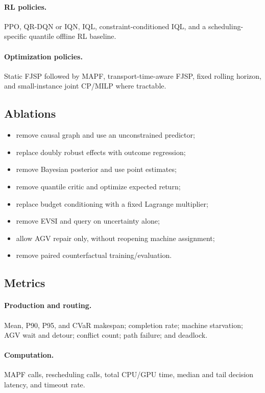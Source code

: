 \documentclass[11pt,a4paper]{article}
\begin{document}
\paragraph{RL policies.}
PPO, QR-DQN or IQN, IQL, constraint-conditioned IQL, and a scheduling-specific
quantile offline RL baseline.

\paragraph{Optimization policies.}
Static FJSP followed by MAPF, transport-time-aware FJSP, fixed rolling horizon,
and small-instance joint CP/MILP where tractable.

\subsection{Ablations}

\begin{itemize}[leftmargin=*]
    \item remove causal graph and use an unconstrained predictor;
    \item replace doubly robust effects with outcome regression;
    \item remove Bayesian posterior and use point estimates;
    \item remove quantile critic and optimize expected return;
    \item replace budget conditioning with a fixed Lagrange multiplier;
    \item remove EVSI and query on uncertainty alone;
    \item allow AGV repair only, without reopening machine assignment;
    \item remove paired counterfactual training/evaluation.
\end{itemize}

\subsection{Metrics}

\paragraph{Production and routing.}
Mean, P90, P95, and CVaR makespan; completion rate; machine starvation; AGV wait
and detour; conflict count; path failure; and deadlock.

\paragraph{Computation.}
MAPF calls, rescheduling calls, total CPU/GPU time, median and tail decision
latency, and timeout rate.
\end{document}
